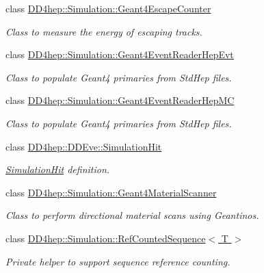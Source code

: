 \begin{DoxyCompactItemize}
class \hyperlink{class_d_d4hep_1_1_simulation_1_1_geant4_escape_counter}{DD4hep::Simulation::Geant4EscapeCounter}
\begin{DoxyCompactList}\small\item\em Class to measure the energy of escaping tracks. \item\end{DoxyCompactList}\item 
class \hyperlink{class_d_d4hep_1_1_simulation_1_1_geant4_event_reader_hep_evt}{DD4hep::Simulation::Geant4EventReaderHepEvt}
\begin{DoxyCompactList}\small\item\em Class to populate Geant4 primaries from StdHep files. \item\end{DoxyCompactList}\item 
class \hyperlink{class_d_d4hep_1_1_simulation_1_1_geant4_event_reader_hep_m_c}{DD4hep::Simulation::Geant4EventReaderHepMC}
\begin{DoxyCompactList}\small\item\em Class to populate Geant4 primaries from StdHep files. \item\end{DoxyCompactList}\item 
class \hyperlink{class_d_d4hep_1_1_d_d_eve_1_1_simulation_hit}{DD4hep::DDEve::SimulationHit}
\begin{DoxyCompactList}\small\item\em \hyperlink{class_d_d4hep_1_1_d_d_eve_1_1_simulation_hit}{SimulationHit} definition. \item\end{DoxyCompactList}\item 
class \hyperlink{class_d_d4hep_1_1_simulation_1_1_geant4_material_scanner}{DD4hep::Simulation::Geant4MaterialScanner}
\begin{DoxyCompactList}\small\item\em Class to perform directional material scans using Geantinos. \item\end{DoxyCompactList}\item 
class \hyperlink{class_d_d4hep_1_1_simulation_1_1_ref_counted_sequence}{DD4hep::Simulation::RefCountedSequence$<$ T $>$}
\begin{DoxyCompactList}\small\item\em Private helper to support sequence reference counting. \item\end{DoxyCompactList}\item 

\end{DoxyCompactItemize}
